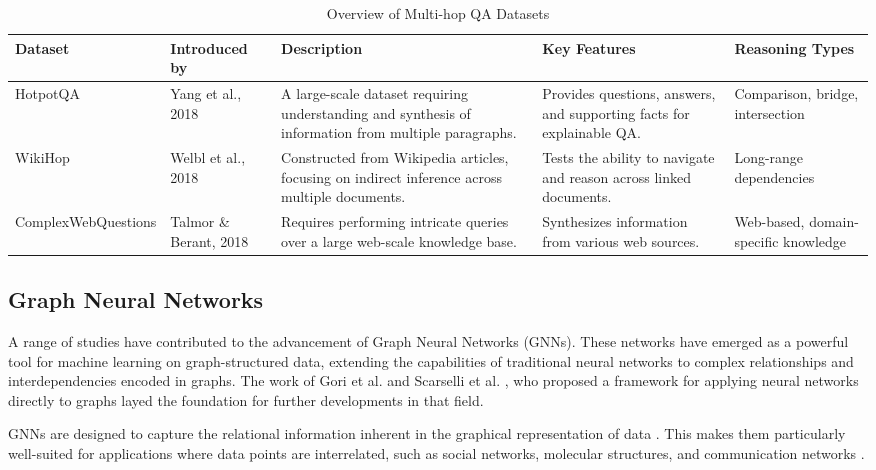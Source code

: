 \documentclass[sigplan,screen]{acmart}
\begin{document}
\begin{table}[ht]
  \centering
  \begin{tabular}{|l|l|p{3cm}|p{3cm}|l|}
  \hline
  \textbf{Dataset}            & \textbf{Introduced by} & \textbf{Description} & \textbf{Key Features} & \textbf{Reasoning Types} \\ \hline
  HotpotQA           & Yang et al., 2018 & A large-scale dataset requiring understanding and synthesis of information from multiple paragraphs. & Provides questions, answers, and supporting facts for explainable QA. & Comparison, bridge, intersection \\ \hline
  WikiHop            & Welbl et al., 2018 & Constructed from Wikipedia articles, focusing on indirect inference across multiple documents. & Tests the ability to navigate and reason across linked documents. & Long-range dependencies \\ \hline
  ComplexWebQuestions & Talmor \& Berant, 2018 & Requires performing intricate queries over a large web-scale knowledge base. & Synthesizes information from various web sources. & Web-based, domain-specific knowledge \\ \hline
  \end{tabular}
  \caption{Overview of Multi-hop QA Datasets}
  \label{table:multihop_datasets}
  \end{table}
  
  
  

\subsection{Graph Neural Networks}

A range of studies have contributed to the advancement of Graph Neural Networks (GNNs). These networks have emerged 
as a powerful tool for machine learning on graph-structured data, extending the capabilities of traditional neural networks to complex relationships and 
interdependencies encoded in graphs. The work of Gori et al. \cite{RN203} and Scarselli et al. \cite{RN204}, who proposed a framework for applying neural networks directly to graphs 
layed the foundation for further developments in that field.

GNNs are designed to capture the relational information inherent in the graphical representation of data \cite{RN205}. This makes them particularly 
well-suited for applications where data points are interrelated, such as social networks, molecular structures, and communication networks \cite{RN206}.
\end{document}
